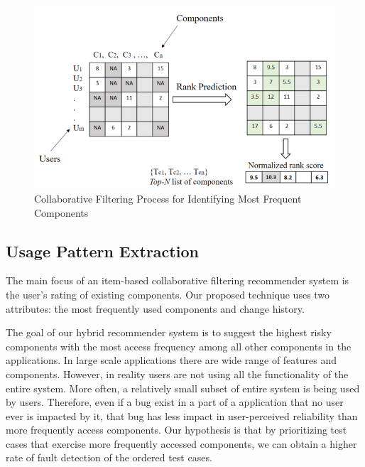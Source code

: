 \begin{figure}[!hb]
	\centering
	\includegraphics[width=0.75\linewidth]{./collaborative-filtring2.png}
	\vspace*{3pt}
	\caption{Collaborative Filtering Process for Identifying Most Frequent Components}
	\label{fig:collaborataivefiltering}
\end{figure} 

\vspace*{3pt}
\subsection{Usage Pattern Extraction}
\label{recommender-approach}

The main focus of an item-based collaborative filtering recommender system is 
the user's rating of existing components. 
Our proposed technique uses two attributes: 
the most frequently used components and change history.

The goal of our hybrid recommender system is to suggest the highest risky 
components with the most access frequency among all other components in the applications. 
In large scale applications there are wide 
range of features and components. However, in reality 
users are not using all the functionality of the entire system. 
More often, a relatively small subset of entire system is being used by users. 
Therefore, even if a bug exist in a part of a application that 
no user ever is impacted by it, that bug has
less impact in user-perceived reliability than more frequently access components.
Our hypothesis is that by prioritizing test cases that exercise more frequently 
accessed components, we can obtain a higher rate of fault
detection of the ordered test cases. 

